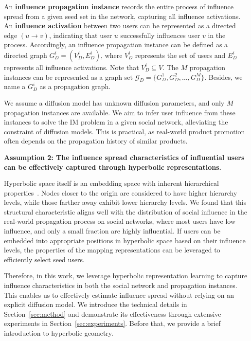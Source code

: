 An \textbf{influence propagation instance} records the entire process of influence spread from a given seed set in the network, capturing all influence activations.
An \textbf{influence activation} between two users can be represented as a directed edge $(u \rightarrow v)$, indicating that user $u$ successfully influences user $v$ in the process.
Accordingly, an influence propagation instance can be defined as a directed graph $G_D^i = (V_D^i, E_D^i)$, where $V_D^i$ represents the set of users and $E_D^i$ represents all influence activations. Note that $V_D^i \subseteq V$.
The $M$ propagation instances can be represented as a graph set $\mathcal{G}_D = \{ G^1_D, G^2_D, \dots, G^M_D \}$. Besides, we name a $G_D^i$ as a propagation graph.

We assume a diffusion model has unknown diffusion parameters, and only $M$ propagation instances are available. 
We aim to infer user influence from these instances to solve the IM problem in a given social network, alleviating the constraint of diffusion models. 
This is practical, as real-world product promotion often depends on the propagation history of similar products.


\textbf{Assumption 2: The influence spread characteristics of influential users can be effectively captured through hyperbolic representations.}

Hyperbolic space itself is an embedding space with inherent hierarchical properties~\cite{TPAMI2021_peng_survey}. 
Nodes closer to the origin are considered to have higher hierarchy levels, while those farther away exhibit lower hierarchy levels. 
We found that this structural characteristic aligns well with the distribution of social influence in the real-world propagation process on social networks, where most users have low influence, and only a small fraction are highly influential.
If users can be embedded into appropriate positions in hyperbolic space based on their influence levels, the properties of the mapping representations can be leveraged to efficiently select seed users.

Therefore, in this work, we leverage hyperbolic representation learning to capture influence characteristics in both the social network and propagation instances. 
This enables us to effectively estimate influence spread without relying on an explicit diffusion model.
We introduce the technical details in Section~\ref{sec:method} and demonstrate its effectiveness through extensive experiments in Section~\ref{sec:experiments}. Before that, we provide a brief introduction to hyperbolic geometry.
